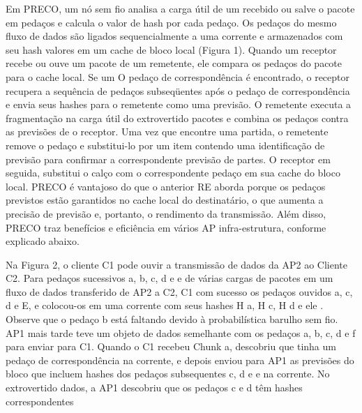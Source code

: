 \documentclass[12pt]{article}
\begin{document}
Em PRECO, um nó sem fio analisa a carga útil de um recebido
ou salve o pacote em pedaços e calcula o valor de hash
por cada pedaço. Os pedaços do mesmo fluxo de dados são
ligados sequencialmente a uma corrente e armazenados com seu hash
valores em um cache de bloco local (Figura 1). Quando um receptor
recebe ou ouve um pacote de um remetente, ele compara
os pedaços do pacote para o cache local. Se um
O pedaço de correspondência é encontrado, o receptor recupera a sequência
de pedaços subseqüentes após o pedaço de correspondência e envia seus
hashes para o remetente como uma previsão.
O remetente executa a fragmentação na carga útil do extrovertido
pacotes e combina os pedaços contra as previsões de
o receptor. Uma vez que encontre uma partida, o remetente remove o
pedaço e substitui-lo por um item contendo uma identificação de previsão
para confirmar a correspondente previsão de partes. O receptor
em seguida, substitui o calço com o correspondente pedaço em sua
cache do bloco local. PRECO é vantajoso do que o anterior
RE aborda porque os pedaços previstos estão garantidos
no cache local do destinatário, o que aumenta a
precisão de previsão e, portanto, o rendimento da transmissão.
Além disso, PRECO traz benefícios e eficiência em vários AP
infra-estrutura, conforme explicado abaixo.


Na Figura 2, o cliente C1 pode ouvir a transmissão de dados
da AP2 ao Cliente C2. Para pedaços sucessivos a, b, c, d e
e de várias cargas de pacotes em um fluxo de dados transferido
de AP2 a C2, C1 com sucesso os pedaços ouvidos a, c, d e
E, e colocou-os em uma corrente com seus hashes H a, H c, H d
e ele . Observe que o pedaço b está faltando devido à probabilística
barulho sem fio. AP1 mais tarde teve um objeto de dados semelhante
com os pedaços a, b, c, d e f para enviar para C1. Quando o C1 recebeu
Chunk a, descobriu que tinha um pedaço de correspondência na corrente,
e depois enviou para AP1 as previsões do bloco que incluem hashes
dos pedaços subsequentes c, d e e na corrente. No extrovertido
dados, a AP1 descobriu que os pedaços c e d têm hashes correspondentes
\end{document}
